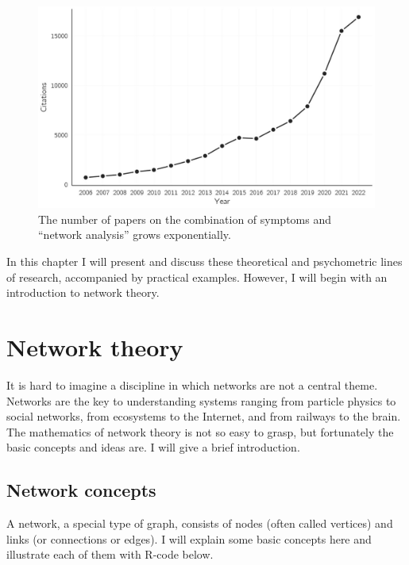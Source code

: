\documentclass[
  a4paper,
  DIV=11,
  numbers=noendperiod]{scrreprt}
\begin{document}
\begin{figure}

{\centering \includegraphics{media/ch6/fig-ch6-img1-old-70.jpg}

}

\caption{\label{fig-ch6-img1-old-70}The number of papers on the
combination of symptoms and ``network analysis'' grows exponentially.}

\end{figure}

In this chapter I will present and discuss these theoretical and
psychometric lines of research, accompanied by practical examples.
However, I will begin with an introduction to network theory.

\hypertarget{sec-Network-theory}{%
\section{Network theory}\label{sec-Network-theory}}

It is hard to imagine a discipline in which networks are not a central
theme. Networks are the key to understanding systems ranging from
particle physics to social networks, from ecosystems to the Internet,
and from railways to the brain. The mathematics of network theory is not
so easy to grasp, but fortunately the basic concepts and ideas are. I
will give a brief introduction.

\hypertarget{sec-Network-concepts}{%
\subsection{Network concepts}\label{sec-Network-concepts}}

A network, a special type of graph, consists of nodes (often called
vertices) and links (or connections or edges). I will explain some basic
concepts here and illustrate each of them with R-code below.
\end{document}
